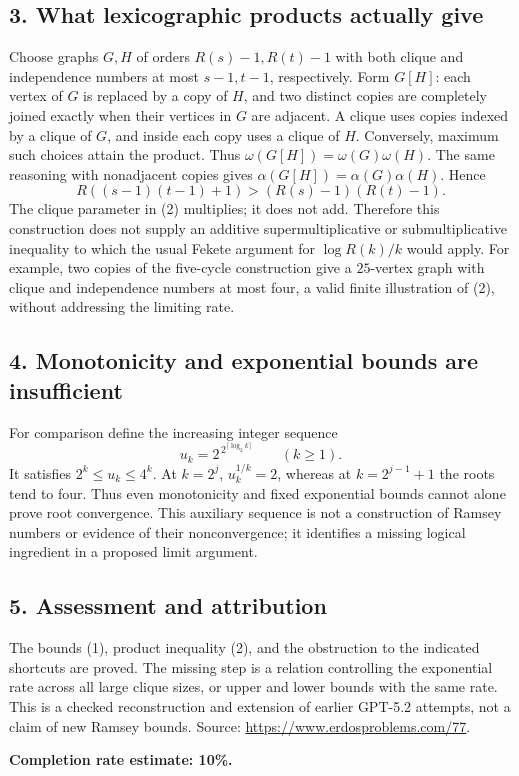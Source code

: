 \subsection*{3. What lexicographic products actually give}
Choose graphs $G,H$ of orders $R(s)-1,R(t)-1$ with both clique and independence numbers at most $s-1,t-1$, respectively. Form $G[H]$: each vertex of $G$ is replaced by a copy of $H$, and two distinct copies are completely joined exactly when their vertices in $G$ are adjacent.
A clique uses copies indexed by a clique of $G$, and inside each copy uses a clique of $H$. Conversely, maximum such choices attain the product. Thus $\omega(G[H])=\omega(G)\omega(H)$. The same reasoning with nonadjacent copies gives $\alpha(G[H])=\alpha(G)\alpha(H)$. Hence
\[
 R((s-1)(t-1)+1)>(R(s)-1)(R(t)-1). \tag{2}
\]
The clique parameter in (2) multiplies; it does not add. Therefore this construction does not supply an additive supermultiplicative or submultiplicative inequality to which the usual Fekete argument for $\log R(k)/k$ would apply. For example, two copies of the five-cycle construction give a $25$-vertex graph with clique and independence numbers at most four, a valid finite illustration of (2), without addressing the limiting rate.

\subsection*{4. Monotonicity and exponential bounds are insufficient}
For comparison define the increasing integer sequence
\[
 u_k=2^{\,2^{\lceil\log_2 k\rceil}}\qquad(k\ge1).
\]
It satisfies $2^k\le u_k\le4^k$. At $k=2^j$, $u_k^{1/k}=2$, whereas at $k=2^{j-1}+1$ the roots tend to four. Thus even monotonicity and fixed exponential bounds cannot alone prove root convergence. This auxiliary sequence is not a construction of Ramsey numbers or evidence of their nonconvergence; it identifies a missing logical ingredient in a proposed limit argument.

\subsection*{5. Assessment and attribution}
The bounds (1), product inequality (2), and the obstruction to the indicated shortcuts are proved. The missing step is a relation controlling the exponential rate across all large clique sizes, or upper and lower bounds with the same rate. This is a checked reconstruction and extension of earlier GPT-5.2 attempts, not a claim of new Ramsey bounds.
Source: \url{https://www.erdosproblems.com/77}.

\textbf{Completion rate estimate: 10\%.}
